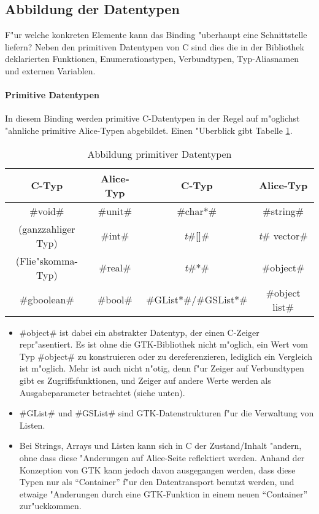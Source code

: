 \documentclass[a4paper,titlepage]{article}
\begin{document}
\subsection{Abbildung der Datentypen}

F"ur welche konkreten Elemente kann das Binding "uberhaupt eine Schnittstelle
liefern? Neben den primitiven Datentypen von C sind dies die in der Bibliothek
deklarierten Funktionen, Enumerationstypen, Verbundtypen, Typ-Aliasnamen
und externen Variablen.

\paragraph{Primitive Datentypen}

In diesem Binding werden primitive C-Datentypen in der Regel auf m"oglichst
"ahnliche primitive Alice-Typen abgebildet. Einen "Uberblick gibt
Tabelle \ref{PrimTab}.

\begin{table}
\begin{center}
  \begin{tabular}{|c|c||c|c|}
  \hline \textbf{C-Typ}     & \textbf{Alice-Typ} &
         \textbf{C-Typ}     & \textbf{Alice-Typ}\\
  \hline #void#             & #unit# & #char*#            & #string#     \\
  \hline (ganzzahliger Typ) & #int#  & \emph{t}#[]#       & \emph{t}# vector#\\
  \hline (Flie"skomma-Typ)  & #real# & \emph{t}#*#        & #object# \\
  \hline #gboolean#         & #bool# & #GList*#/#GSList*# & #object list# \\
  \hline
  \end{tabular}
\end{center}
\caption{Abbildung primitiver Datentypen}
\label{PrimTab}
\end{table}

\begin{itemize}
\item
#object# ist dabei ein abstrakter Datentyp, der einen C-Zeiger repr"asentiert.
Es ist ohne die GTK-Bibliothek nicht m"oglich, ein Wert vom Typ #object# zu
konstruieren oder zu dereferenzieren, lediglich ein Vergleich ist m"oglich.
Mehr ist auch nicht n"otig, denn f"ur Zeiger auf Verbundtypen gibt es
Zugriffsfunktionen, und Zeiger auf andere Werte werden als Ausgabeparameter
betrachtet (siehe unten).

\item 
#GList# und #GSList# sind GTK-Datenstrukturen f"ur die Verwaltung von Listen.

\item
Bei Strings, Arrays und Listen kann sich in C der Zustand/Inhalt "andern,
ohne dass diese "Anderungen auf Alice-Seite reflektiert werden. Anhand der
Konzeption von GTK kann jedoch davon ausgegangen werden, dass diese Typen
nur als ``Container'' f"ur den Datentransport benutzt werden, und etwaige
"Anderungen durch eine GTK-Funktion in einem neuen ``Container'' zur"uckkommen.
\end{itemize}
\end{document}
